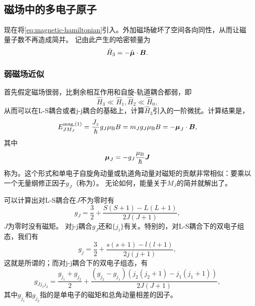 \subsection{磁场中的多电子原子}

现在将\eqref{eq:magnetic-hamiltonian}引入。外加磁场破坏了空间各向同性，从而让磁量子数不再造成简并。
记由此产生的哈密顿量为
\begin{equation}
    \hat{H}_3 = - \hat{\vb*{\mu}} \cdot \vb*{B}.
\end{equation}

\subsubsection{弱磁场近似}

首先假定磁场很弱，比剩余相互作用和自旋-轨道耦合都弱，即
\begin{equation}
    \hat{H}_3 \ll \hat{H}_1, \hat{H}_2 \ll \hat{H}_0,
\end{equation}
从而可以在L-S耦合或者j-j耦合的基础上，计算$\hat{H}_3$引入的一阶微扰。计算结果是，
\begin{equation}
    E^{\text{mag}, (1)}_{JM_J} = \frac{J_z}{\hbar} g_J \mu_\text{B} B = m_J g_J \mu_\text{B} B = - \vb*{\mu}_J \cdot \vb*{B},
\end{equation}
其中
\begin{equation}
    \vb*{\mu}_J = - g_J \frac{\mu_\text{B}}{\hbar} \vb*{J}
    \label{eq:atom-mean-magnetic}
\end{equation}
称为。这个形式和单电子自旋角动量或轨道角动量对磁矩的贡献非常相似：要乘以一个无量纲修正因子$g_J$（称为）。
无论如何，能量关于$M_J$的简并就解出了。

可以计算出对L-S耦合在$J$不为零时有
\begin{equation}
    g_J = \frac{3}{2} + \frac{S(S+1) - L(L+1)}{2J(J+1)},
    \label{eq:g-factor-ls}
\end{equation}
$J$为零时没有磁矩。
对j-j耦合$g_J$还和$\{j_i\}$有关。特别的，对L-S耦合下的双电子组态，我们有
\begin{equation}
    g_{j} = \frac{3}{2} + \frac{s(s+1) - l(l+1)}{2j(j+1)},
\end{equation}
这就是所谓的；而对j-j耦合下的双电子组态，有
\begin{equation}
    g_{J j_1 j_2} = \frac{g_{j_1} + g_{j_2}}{2} + \frac{(g_{j_2} - g_{j_1})(j_2(j_2+1) - j_1(j_1+1))}{2J(J+1)},
\end{equation}
其中$g_{j_1}$和$g_{j_2}$指的是单电子的磁矩和总角动量相差的因子。

